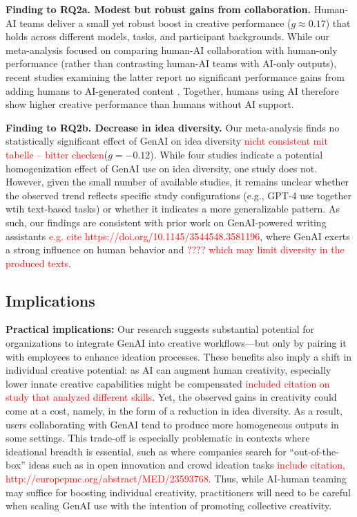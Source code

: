 \documentclass[manuscript, screen, review, acmsmall, anonymous]{acmart}
\newcommand{\TODO}[1]{\textcolor{red}{#1}}
\begin{document}
\textbf{Finding to RQ2a. Modest but robust gains from collaboration.} Human-AI teams deliver a small yet robust boost in creative performance ($g\approx 0.17$) that holds across different models, tasks, and participant backgrounds. While our meta-analysis focused on comparing human-AI collaboration with human-only performance (rather than contrasting human-AI teams with AI-only outputs), recent studies examining the latter report no significant performance gains from adding humans to AI-generated content  \cite{LeeChung2024}. Together, humans using AI therefore show higher creative performance than humans without AI support.

\textbf{Finding to RQ2b. Decrease in idea diversity.} Our meta-analysis finds no statistically significant effect of GenAI on idea diversity \TODO{nicht consistent mit tabelle -- bitter checken}($g = -0.12$). While four studies indicate a potential homogenization effect of GenAI use on idea diversity, one study does not. However, given the small number of available studies, it remains unclear whether the observed trend reflects specific study configurations (e.g., GPT-4 use together wtih text-based tasks) or whether it indicates a more generalizable pattern. As such, our findings are consistent with prior work on GenAI-powered writing assistants \TODO{e.g. cite https://doi.org/10.1145/3544548.3581196}, where GenAI exerts a strong influence on human behavior and \TODO{???? which may limit diversity in the produced texts}. 



\subsection{Implications}

\textbf{Practical implications:} Our research suggests substantial potential for organizations to integrate GenAI into creative workflows---but only by pairing it with employees to enhance ideation processes. These benefits also imply a shift in individual creative potential: as AI can augment human creativity, especially lower innate creative capabilities might be compensated \TODO{included citation on study that analyzed different skills}. Yet, the observed gains in creativity could come at a cost, namely, in the form of a reduction in idea diversity. As a result, users collaborating with GenAI tend to produce more homogeneous outputs in some settings. This trade-off is especially problematic in contexts where ideational breadth is essential, such as where companies search for ``out-of-the-box'' ideas such as in open innovation and crowd ideation tasks \TODO{include citation, http://europepmc.org/abstract/MED/23593768}. Thus, while AI-human teaming may suffice for boosting individual creativity, practitioners will need to be careful when scaling GenAI use with the intention of promoting collective creativity.
\end{document}
